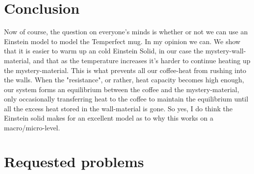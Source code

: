 \documentclass{article}
\begin{document}
\section{Conclusion}
Now of course, the question on everyone's minds is whether or not we can use an Einstein model to model the Temperfect mug. In my opinion we can. We show that it is easier to warm up an cold Einstein Solid, in our case the mystery-wall-material, and that as the temperature increases it's harder to continue heating up the mystery-material. This is what prevents all our coffee-heat from rushing into the walls. When the "resistance", or rather, heat capacity becomes high enough, our system forms an equilibrium between the coffee and the mystery-material, only occasionally transferring heat to the coffee to maintain the equilibrium until all the excess heat stored in the wall-material is gone.
\newline
So yes, I do think the Einstein solid makes for an excellent model as to why this works on a macro/micro-level.




\clearpage

\appendix

\section{Requested problems}
\end{document}
